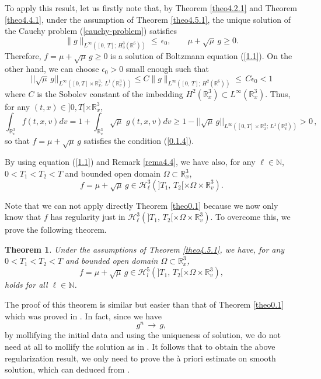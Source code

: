 \documentclass{amsart}[12pt, article]
\newtheorem{theo}{Theorem}[section]
\begin{document}
To apply this result, let us firstly note that, by Theorem \ref{theo4.2.1} and Theorem
\ref{theo4.4.1}, under the assumption of Theorem \ref{theo4.5.1},
the unique solution of the Cauchy problem (\ref{cauchy-problem})
satisfies
$$
\|g\|_{L^\infty([0,\, T];\, H^3_3({{{\mathbb R}}}^6))}\leq\,\epsilon_0,\qquad
\mu+ \sqrt\mu\, g\geq 0.
$$
Therefore, $f=\mu + \sqrt \mu\, g \geq 0$ is a solution of Boltzmann
equation (\ref{1.1}). On the other hand, we can choose $\epsilon_0>0$
small enough such that
$$
|| \sqrt\mu\,g||_{L^\infty([0, T]\times{{{\mathbb R}}}^3_{x};\, L^1({{{\mathbb R}}}^3_v
))}\leq C\|g\|_{L^\infty([0,\, T];\, H^2({{{\mathbb R}}}^6))}\leq\,C\epsilon_0<1
$$
where $C$ is the Sobolev constant of the imbedding $H^2({{{\mathbb R}}}^3_x)\subset
L^\infty({{{\mathbb R}}}^3_x)$. Thus, for any $(t, x)\in ]0, T[\times{{{\mathbb R}}}^3_x$,
\begin{equation}\label{5.3.1+0}
\int_{{{{\mathbb R}}}^3_v} f(t,x,v) dv =1+ \int_{{{{\mathbb R}}}^3_v} \sqrt\mu\,\, g(t, x,
v) dv \geq 1- || \sqrt\mu\,g||_{L^\infty([0, T]\times{{{\mathbb R}}}^3_{x};\,
L^1({{{\mathbb R}}}^3_v ))}>0\,,
\end{equation}
so that $f=\mu + \sqrt \mu\, g$ satisfies the condition (\ref{0.1.4}).

By using equation (\ref{1.1}) and Remark \ref{rema4.4}, we
have also, for any $\ell\in{{\mathbb N}}$,  $0< T_1<T_2< T$ and
bounded open domain $\Omega\subset{{{\mathbb R}}}^3_x$,
$$
f=\mu + \sqrt \mu\, g \in {\mathcal H}^3_\ell  (]T_1, \,
T_2[\times\Omega\times{{{\mathbb R}}}^3_v).
$$

 Note that we can not apply directly Theorem \ref{theo0.1}
  because we now only know that $f$ has regularity just in ${\mathcal H}^3_\ell  (]T_1, \,
T_2[\times\Omega\times{{{\mathbb R}}}^3_v)$.
To overcome this, we prove the following theorem.

\begin{theo}\label{theo5.3.1}
Under the assumptions of Theorem \ref{theo4.5.1}, we have, for any
$0<T_1<T_2<T$ and bounded open domain $\Omega\subset{{{\mathbb R}}}^3_x$,
$$
f=\mu + \sqrt \mu\, g \in {\mathcal H}^5_l  (]T_1, \,
T_2[\times\Omega\times{{{\mathbb R}}}^3_v),
$$
holds for all $\ell\in{{\mathbb N}}$.
\end{theo}

The proof of this theorem is similar but easier than
that of Theorem \ref{theo0.1} which was proved in \cite{amuxy-nonlinear-3}. In fact, since we have
$$
g^n\,\rightarrow \,g,
$$
by mollifying the initial data and using the uniqueness of solution,
we do not need at all to mollify the solution as in  \cite{amuxy-nonlinear-3}.
It follows that to obtain the above regularization result, we
 only need to prove the \`a priori estimate on smooth solution, which can deduced {}from \cite{amuxy-nonlinear-3}.
\end{document}
